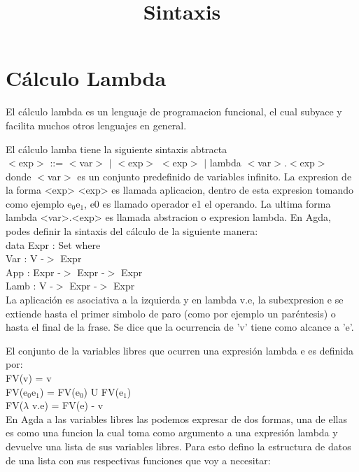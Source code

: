 \documentclass{book}
\begin{document}
\chapter{Cálculo Lambda}
\label{chap:lambda}

El cálculo lambda es un lenguaje de programacion funcional, el cual subyace y facilita muchos otros lenguajes en general.

\title{Sintaxis}
\maketitle

El cálculo lamba tiene la siguiente sintaxis abtracta \\

$<$exp$>$ ::= $<$var$>$ $|$ $<$exp$>$ $<$exp$>$ $|$ lambda $<$var$>$.$<$exp$>$ \\

donde $<$var$>$ es un conjunto predefinido de variables infinito. La expresion de la forma <exp> <exp> es llamada aplicacion, dentro de esta expresion tomando como ejemplo e$_{0}$e$_{1}$, e0 es llamado operador e1 el operando. La ultima forma lambda <var>.<exp> es llamada abstracion o expresion lambda.
En Agda, podes definir la sintaxis del cálculo de la siguiente manera: \\

data Expr : Set where \\
Var   : V -$>$ Expr \\
App   : Expr -$>$ Expr -$>$ Expr \\
Lamb  : V -$>$ Expr -$>$ Expr \\

                             
La aplicación es asociativa a la izquierda y en lambda v.e, la subexpresion e se extiende hasta el primer simbolo de paro (como por ejemplo un paréntesis) o hasta el final de la frase. Se dice que la ocurrencia de 'v' tiene como alcance a 'e'.

El conjunto de la variables libres que ocurren una expresión lambda e es definida por: \\

FV(v) = {v} \\
FV(e$_{0}$e$_{1}$) = FV(e$_{0}$) U FV(e$_{1}$) \\
FV($\lambda$ v.e) = FV(e) - {v} \\

En Agda a las variables libres las podemos expresar de dos formas, una de ellas es como una funcion la cual toma como argumento a una expresión lambda y devuelve una lista de sus variables libres. Para esto defino la estructura de datos de una lista con sus respectivas funciones que voy a necesitar: \\
\end{document}
